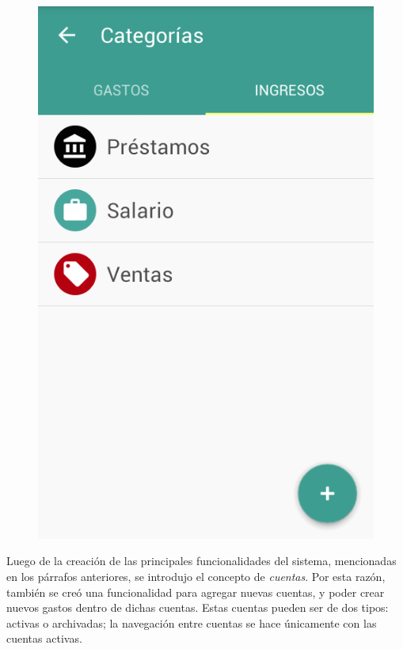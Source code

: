 \begin{figure}[ht]
\begin{minipage}{.5\textwidth}
  \includegraphics[scale=0.45,type=png,ext=.png,read=.png]{imagenes/income_categories}
  \captionsetup{justification=centering}
  \label{fig:interfazListarIncomeCategories}
\end{minipage}
\end{figure}

Luego de la creación de las principales funcionalidades del sistema, mencionadas en los párrafos anteriores, se introdujo el concepto de \textit{cuentas}. Por esta razón, también se creó una funcionalidad para agregar nuevas cuentas, y poder crear nuevos gastos dentro de dichas cuentas. Estas cuentas pueden ser de dos tipos: activas o archivadas; la navegación entre cuentas se hace únicamente con las cuentas activas. 

